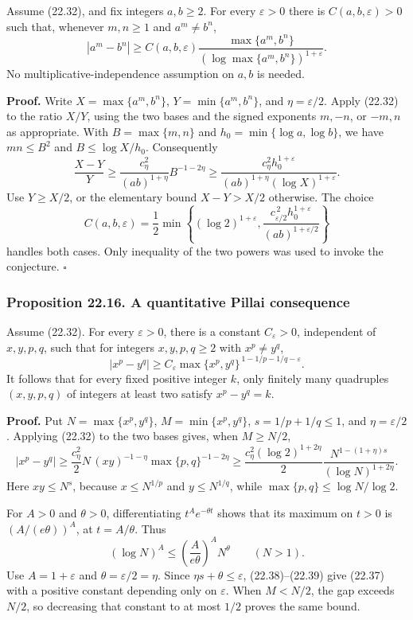 \documentclass[
  11pt,
  a4paper,
]{article}
\begin{document}
Assume (22.32), and fix integers \(a,b\ge2\). For every
\(\varepsilon>0\) there is \(C(a,b,\varepsilon)>0\) such that, whenever
\(m,n\ge1\) and \(a^m\ne b^n\), \[
 |a^m-b^n|\ge C(a,b,\varepsilon)
 \frac{\max\{a^m,b^n\}}
      {(\log\max\{a^m,b^n\})^{1+\varepsilon}}.
 \tag{22.36}
\] No multiplicative-independence assumption on \(a,b\) is needed.

\textbf{Proof.} Write \(X=\max\{a^m,b^n\}\), \(Y=\min\{a^m,b^n\}\), and
\(\eta=\varepsilon/2\). Apply (22.32) to the ratio \(X/Y\), using the
two bases and the signed exponents \(m,-n\), or \(-m,n\) as appropriate.
With \(B=\max\{m,n\}\) and \(h_0=\min\{\log a,\log b\}\), we have
\(mn\le B^2\) and \(B\le\log X/h_0\). Consequently \[
 \frac{X-Y}{Y}\ge\frac{c_\eta^2}{(ab)^{1+\eta}}B^{-1-2\eta}
 \ge\frac{c_\eta^2h_0^{1+\varepsilon}}
          {(ab)^{1+\eta}(\log X)^{1+\varepsilon}}.
\] Use \(Y\ge X/2\), or the elementary bound \(X-Y>X/2\) otherwise. The
choice \[
 C(a,b,\varepsilon)=\frac12\min\left\{
 (\log2)^{1+\varepsilon},
 \frac{c_{\varepsilon/2}^{\,2}h_0^{1+\varepsilon}}
 {(ab)^{1+\varepsilon/2}}\right\}
\] handles both cases. Only inequality of the two powers was used to
invoke the conjecture. \(\square\)

\subsubsection{Proposition 22.16. A quantitative Pillai
consequence}\label{proposition-22.16.-a-quantitative-pillai-consequence}

Assume (22.32). For every \(\varepsilon>0\), there is a constant
\(C_\varepsilon>0\), independent of \(x,y,p,q\), such that for integers
\(x,y,p,q\ge2\) with \(x^p\ne y^q\), \[
 |x^p-y^q|\ge C_\varepsilon
       \max\{x^p,y^q\}^{\,1-1/p-1/q-\varepsilon}.
 \tag{22.37}
\] It follows that for every fixed positive integer \(k\), only finitely
many quadruples \((x,y,p,q)\) of integers at least two satisfy
\(x^p-y^q=k\).

\textbf{Proof.} Put \(N=\max\{x^p,y^q\}\), \(M=\min\{x^p,y^q\}\),
\(s=1/p+1/q\le1\), and \(\eta=\varepsilon/2\). Applying (22.32) to the
two bases gives, when \(M\ge N/2\), \[
 |x^p-y^q|
 \ge \frac{c_\eta^2}{2}
       N\,(xy)^{-1-\eta}
       \max\{p,q\}^{-1-2\eta}
 \ge\frac{c_\eta^2(\log2)^{1+2\eta}}2
       \frac{N^{1-(1+\eta)s}}{(\log N)^{1+2\eta}}.
 \tag{22.38}
\] Here \(xy\le N^s\), because \(x\le N^{1/p}\) and \(y\le N^{1/q}\),
while \(\max\{p,q\}\le\log N/\log2\).

For \(A>0\) and \(\theta>0\), differentiating \(t^Ae^{-\theta t}\) shows
that its maximum on \(t>0\) is \((A/(e\theta))^A\), at \(t=A/\theta\).
Thus \[
 (\log N)^A\le\left(\frac{A}{e\theta}\right)^A N^\theta
 \qquad(N>1).
 \tag{22.39}
\] Use \(A=1+\varepsilon\) and \(\theta=\varepsilon/2=\eta\). Since
\(\eta s+\theta\le\varepsilon\), (22.38)--(22.39) give (22.37) with a
positive constant depending only on \(\varepsilon\). When \(M<N/2\), the
gap exceeds \(N/2\), so decreasing that constant to at most \(1/2\)
proves the same bound.
\end{document}
